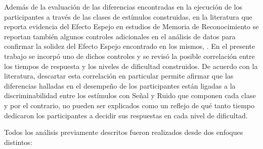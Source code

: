 \begin{enumerate}
Además de la evaluación de las diferencias encontradas en la ejecución de los participantes a través de las clases de estímulos construidas, en la literatura que reporta evidencia del Efecto Espejo en estudios de Memoria de Reconocimiento se reportan también algunos controles adicionales en el análisis de datos para confirmar la solidez del Efecto Espejo encontrado en los mismos, \parencite{Glanzer1990}. En el presente trabajo se incorpó uno de dichos controles y se revisó la posible correlación entre los tiempos de respuesta y los niveles de dificultad construidos. De acuerdo con la literatura, descartar esta correlación en particular permite afirmar que las diferencias halladas en el desempeño de los participantes están ligadas a la discriminabilidad entre los estímulos con Señal y Ruido que componen cada clase y por el contrario, no pueden ser explicados como un reflejo de qué tanto tiempo dedicaron los participantes a decidir sus respuestas en cada nivel de dificultad.\\
\end{enumerate}

Todos los análisis previamente descritos fueron realizados desde dos enfoques distintos:\\

